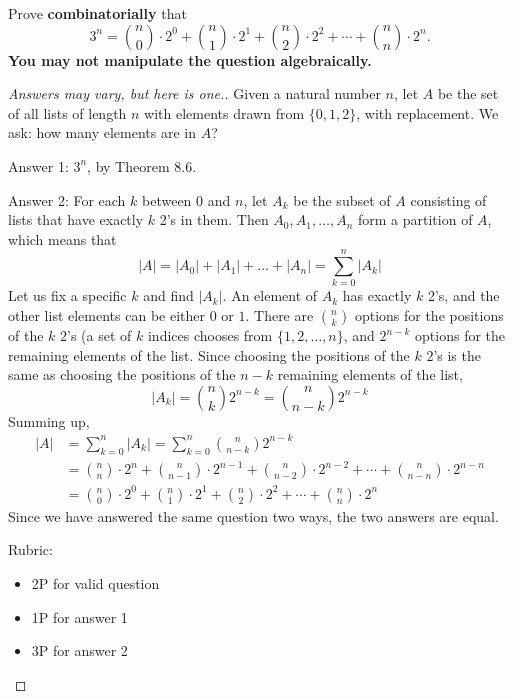 \documentclass{article}
\theoremstyle{definition}
\begin{document}
\begin{question}{6}
    Prove \textbf{combinatorially} that
    \[ 3^n = \binom{n}{0} \cdot 2^0 + \binom{n}{1}\cdot 2^1+ \binom{n}{2}\cdot 2^2+\cdots +\binom{n}{n}\cdot 2^n. \]
    \textbf{You may not manipulate the question algebraically.}
\end{question}
\begin{proof}
    [Answers may vary, but here is one.]
    Given a natural number $n$, let $A$ be the set of all lists of length $n$ with elements drawn from $\{0,1,2\}$,
    with replacement.
    We ask: how many elements are in $A$?

    \noindent Answer 1: $3^n$, by Theorem 8.6.

    \noindent Answer 2: 
    For each $k$ between $0$ and $n$, let $A_k$ be the subset of $A$ consisting of lists that have exactly $k$ 2's in them. Then $A_0, A_1, \dots, A_n$ form a partition of $A$,
    which means that
    \[
        |A| = |A_0| + |A_1| + \dots + |A_n|
        = \sum_{k=0}^n |A_k|
    \]
    Let us fix a specific $k$ and find $|A_k|$.
    An element of $A_k$ has exactly $k$ 2's, and 
    the other list elements can be either $0$ or $1$. 
    There are $\binom{n}{k}$ options for the positions
    of the $k$ $2$'s (a set of $k$ indices chooses from $\{1,2,\dots,n\}$, 
    and $2^{n-k}$ options for the remaining elements of the list.
    Since choosing the positions of the $k$ $2$'s is the same as choosing the positions of the $n-k$ remaining elements of the list,
    \[
        |A_k| = \binom{n}{k} 2^{n-k} = \binom{n}{n-k} 2^{n-k}
    \]
    Summing up,
    \begin{align*}
        |A| &= \sum_{k=0}^n |A_k| = \sum_{k=0}^n \binom{n}{n-k} 2^{n-k}
        \\&= \binom{n}{n} \cdot 2^n + \binom{n}{n-1}\cdot 2^{n-1}+ \binom{n}{n-2}\cdot 2^{n-2}+\cdots +\binom{n}{n-n}\cdot 2^{n-n}
        \\&= \binom{n}{0} \cdot 2^0 + \binom{n}{1}\cdot 2^1+ \binom{n}{2}\cdot 2^2+\cdots +\binom{n}{n}\cdot 2^n
    \end{align*}
    Since we have answered the same question two ways, the two answers are equal.\qedhere
    
{\color{red} Rubric:
\begin{itemize}
\item 2P for valid question
\item 1P for answer 1
\item 3P for answer 2
\end{itemize}}
\end{proof}
\end{document}
